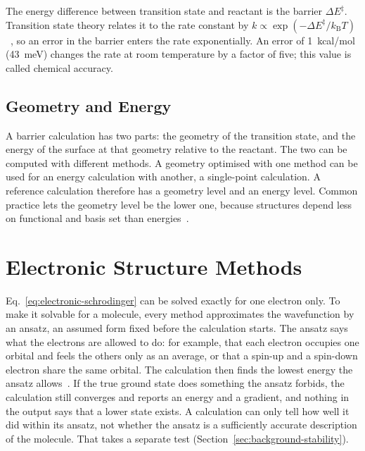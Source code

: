 The energy difference between transition state and reactant is the barrier
$\Delta E^\ddagger$. Transition state theory relates it to the rate constant
by $k \propto \exp(-\Delta E^\ddagger / k_\text{B} T)$~\cite{eyring1935}, so
an error in the barrier enters the rate exponentially. An error of
1~kcal/mol (43~meV) changes the rate at room temperature by a factor of
five; this value is called chemical accuracy.

\subsection{Geometry and Energy}
\label{sec:geom-energy}

A barrier calculation has two parts: the geometry of the transition state,
and the energy of the surface at that geometry relative to the reactant. The
two can be computed with different methods. A geometry optimised with one
method can be used for an energy calculation with another, a single-point
calculation. A reference calculation therefore has a geometry level and an
energy level. Common practice lets the geometry level be the lower one,
because structures depend less on functional and basis set than
energies~\cite{bursch2022}.

\section{Electronic Structure Methods}
\label{sec:background-electronic}

Eq.~\eqref{eq:electronic-schrodinger} can be solved exactly for one
electron only. To make it solvable for a molecule, every method
approximates the wavefunction by an ansatz, an assumed form fixed
before the calculation starts. The ansatz says what the electrons are
allowed to do: for example, that each electron occupies one orbital
and feels the others only as an average, or that a spin-up and a
spin-down electron share the same orbital. The calculation then finds
the lowest energy the ansatz allows~\cite{szabo1996}. If the true
ground state does something the ansatz forbids, the calculation still
converges and reports an energy and a gradient, and nothing in the
output says that a lower state exists. A calculation can only tell how
well it did within its ansatz, not whether the ansatz is a
sufficiently accurate description of the molecule. That takes a
separate test (Section~\ref{sec:background-stability}).

